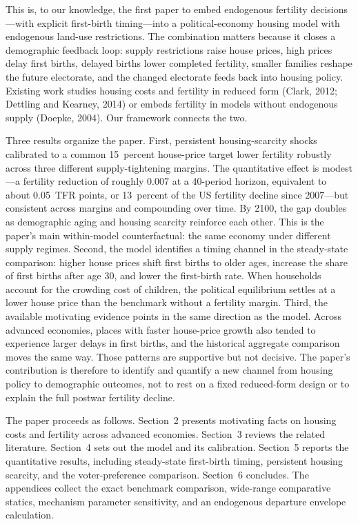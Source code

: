 \documentclass[11pt]{article}
\begin{document}
This is, to our knowledge, the first paper to embed endogenous fertility decisions---with
explicit first-birth timing---into a political-economy housing model with endogenous
land-use restrictions. The combination matters because it closes a demographic feedback loop:
supply restrictions raise house prices, high prices delay first births, delayed births lower
completed fertility, smaller families reshape the future electorate, and the changed
electorate feeds back into housing policy. Existing work studies housing costs and fertility
in reduced form (Clark, 2012; Dettling and Kearney, 2014) or embeds fertility in models
without endogenous supply (Doepke, 2004). Our framework connects the two.

Three results organize the paper. First, persistent housing-scarcity shocks calibrated to a
common 15~percent house-price target lower fertility robustly across three different
supply-tightening margins. The quantitative effect is modest---a fertility reduction of
roughly 0.007 at a 40-period horizon, equivalent to about 0.05~TFR points, or 13~percent
of the US fertility decline since 2007---but consistent across margins and compounding over
time. By 2100, the gap doubles as demographic aging and housing scarcity reinforce each
other. This is the paper's main within-model counterfactual: the same economy under different
supply regimes. Second, the model identifies a timing channel in the steady-state comparison:
higher house prices shift first births to older ages, increase the share of first births after
age 30, and lower the first-birth rate. When households account for the crowding cost of
children, the political equilibrium settles at a lower house price than the benchmark without
a fertility margin. Third, the available motivating evidence points in the same direction as
the model. Across advanced economies, places with faster house-price growth also tended to
experience larger delays in first births, and the historical aggregate comparison moves the
same way. Those patterns are supportive but not decisive. The paper's contribution is
therefore to identify and quantify a new channel from housing policy to demographic outcomes,
not to rest on a fixed reduced-form design or to explain the full postwar fertility decline.

The paper proceeds as follows. Section~2 presents motivating facts on housing costs and
fertility across advanced economies. Section~3 reviews the related literature. Section~4 sets
out the model and its calibration. Section~5 reports the quantitative results, including
steady-state first-birth timing, persistent housing scarcity, and the voter-preference
comparison. Section~6 concludes. The appendices collect the exact benchmark comparison,
wide-range comparative statics, mechanism parameter sensitivity, and an endogenous departure
envelope calculation.
\end{document}
